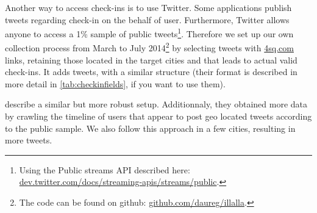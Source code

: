 Another way to access check-ins is to use Twitter. Some applications publish
tweets regarding check-in on the behalf of user. Furthermore, Twitter allows
anyone to access a 1\% sample of public tweets\footnote{Using the Public
streams API described here:
\href{https://dev.twitter.com/docs/streaming-apis/streams/public}%
{\url{dev.twitter.com/docs/streaming-apis/streams/public}}.}.
 Therefore we set up our own
collection process from March to July 2014\footnote{The code can be found on
github: \href{https://github.com/daureg/illalla}%
{\url{github.com/daureg/illalla}}.} by selecting tweets with
\url{4sq.com} links, retaining those located in the target cities and that
leads to actual valid check-ins. It adds  tweets, with a
similar structure (their format is described in more detail in
\autoref{tab:checkinfields}, if you want to use them).

\Textcite{TwitterMongoDB13} describe a similar but more robust setup.
Additionnaly, they obtained more data by crawling the timeline of users that
appear to post geo located tweets according to the public sample. We also
follow this approach in a few cities, resulting in  more
tweets.

